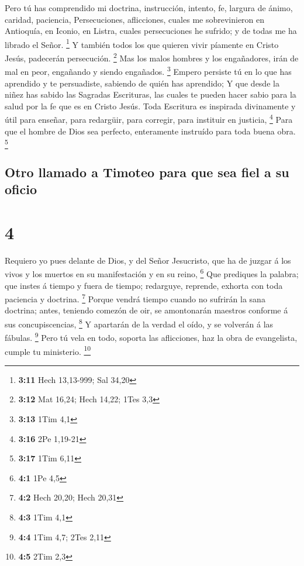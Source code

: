  Pero tú has comprendido mi doctrina, instrucción,
intento, fe, largura de ánimo, caridad, paciencia, 
Persecuciones, aflicciones, cuales me sobrevinieron en Antioquía, en
Iconio, en Listra, cuales persecuciones he sufrido; y de todas me ha
librado el Señor. \footnote{\textbf{3:11} Hech 13,13-999; Sal 34,20}
 Y también todos los que quieren vivir píamente en Cristo
Jesús, padecerán persecución. \footnote{\textbf{3:12} Mat 16,24; Hech
  14,22; 1Tes 3,3}  Mas los malos hombres y los
engañadores, irán de mal en peor, engañando y siendo engañados.
\footnote{\textbf{3:13} 1Tim 4,1}  Empero persiste tú en
lo que has aprendido y te persuadiste, sabiendo de quién has aprendido;
 Y que desde la niñez has sabido las Sagradas Escrituras,
las cuales te pueden hacer sabio para la salud por la fe que es en
Cristo Jesús.  Toda Escritura es inspirada divinamente y
útil para enseñar, para redargüir, para corregir, para instituir en
justicia, \footnote{\textbf{3:16} 2Pe 1,19-21}  Para que
el hombre de Dios sea perfecto, enteramente instruído para toda buena
obra. \footnote{\textbf{3:17} 1Tim 6,11}

\hypertarget{otro-llamado-a-timoteo-para-que-sea-fiel-a-su-oficio}{%
\subsection{Otro llamado a Timoteo para que sea fiel a su
oficio}\label{otro-llamado-a-timoteo-para-que-sea-fiel-a-su-oficio}}

\hypertarget{section-3}{%
\section{4}\label{section-3}}

 Requiero yo pues delante de Dios, y del Señor Jesucristo,
que ha de juzgar á los vivos y los muertos en su manifestación y en su
reino, \footnote{\textbf{4:1} 1Pe 4,5}  Que prediques la
palabra; que instes á tiempo y fuera de tiempo; redarguye, reprende,
exhorta con toda paciencia y doctrina. \footnote{\textbf{4:2} Hech
  20,20; Hech 20,31}  Porque vendrá tiempo cuando no
sufrirán la sana doctrina; antes, teniendo comezón de oir, se
amontonarán maestros conforme á sus concupiscencias, \footnote{\textbf{4:3}
  1Tim 4,1}  Y apartarán de la verdad el oído, y se
volverán á las fábulas. \footnote{\textbf{4:4} 1Tim 4,7; 2Tes 2,11}
 Pero tú vela en todo, soporta las aflicciones, haz la
obra de evangelista, cumple tu ministerio. \footnote{\textbf{4:5} 2Tim
  2,3}


